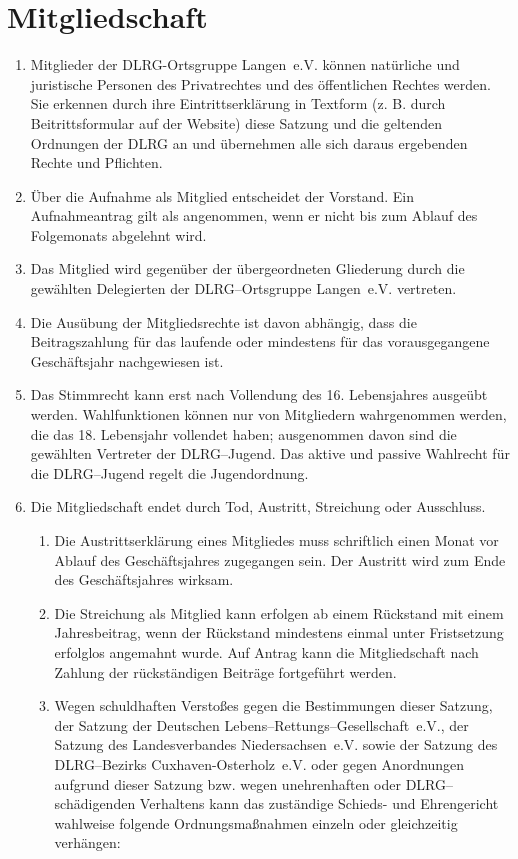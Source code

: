 \documentclass[%
12pt, %
a4paper, %
headsepline, %
parskip, %
headings=normal, %
]{scrreprt}
\begin{document}
\section{Mitgliedschaft}
\label{sec:mitgliedschaft}
\begin{enumerate}
    \item Mitglieder der DLRG-Ortsgruppe Langen~e.V. können natürliche und juristische Personen des Privatrechtes und des öffentlichen Rechtes werden. Sie erkennen durch ihre Eintrittserklärung in Textform (z. B. durch Beitrittsformular auf der Website) diese Satzung und die geltenden Ordnungen der DLRG an und übernehmen alle sich daraus ergebenden Rechte und Pflichten.
    \item Über die Aufnahme als Mitglied entscheidet der Vorstand. Ein Aufnahmeantrag gilt als angenommen, wenn er nicht bis zum Ablauf des Folgemonats abgelehnt wird.
    \item Das Mitglied wird gegenüber der übergeordneten Gliederung durch die gewählten Delegierten der DLRG--Ortsgruppe Langen~e.V. vertreten.
    \item Die Ausübung der Mitgliedsrechte ist davon abhängig, dass die Beitragszahlung für das laufende oder mindestens für das vorausgegangene Geschäftsjahr nachgewiesen ist.
    \item Das Stimmrecht kann erst nach Vollendung des 16. Lebensjahres ausgeübt werden. Wahlfunktionen können nur von Mitgliedern wahrgenommen werden, die das 18. Lebensjahr vollendet haben; ausgenommen davon sind die gewählten Vertreter der DLRG--Jugend. Das aktive und passive Wahlrecht für die DLRG--Jugend regelt die Jugendordnung.
    \item Die Mitgliedschaft endet durch Tod, Austritt, Streichung oder Ausschluss.\begin{enumerate}[noitemsep]
        \item Die Austrittserklärung eines Mitgliedes muss schriftlich einen Monat vor Ablauf des Geschäftsjahres zugegangen sein. Der Austritt wird zum Ende des Geschäftsjahres wirksam.
        \item Die Streichung als Mitglied kann erfolgen ab einem Rückstand mit einem Jahresbeitrag, wenn der Rückstand mindestens einmal unter Fristsetzung erfolglos angemahnt wurde. Auf Antrag kann die Mitgliedschaft nach Zahlung der rückständigen Beiträge fortgeführt werden.
        \item Wegen schuldhaften Verstoßes gegen die Bestimmungen dieser Satzung, der Satzung der Deutschen Lebens--Rettungs--Gesellschaft~e.V., der Satzung des Landesverbandes Niedersachsen~e.V. sowie der Satzung des DLRG--Bezirks Cuxhaven-Osterholz~e.V. oder gegen Anordnungen aufgrund dieser Satzung bzw. wegen unehrenhaften oder DLRG--schädigenden Verhaltens kann das zuständige Schieds- und Ehrengericht wahlweise folgende Ordnungsmaßnahmen einzeln oder gleichzeitig verhängen:\begin{enumerate}

\end{enumerate}
\end{enumerate}
\end{enumerate}
\end{document}
